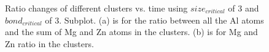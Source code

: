 \newpage
\begingroup
\begin{figure}[!ht]
  \centering
\caption[Ratio changes of different clusters vs. time using $size_{critical}$ of 3 and $bond_{critical}$ of 3.]{Ratio changes of different clusters vs. time using $size_{critical}$ of 3 and $bond_{critical}$ of 3. Subplot. (a) is for the ratio between all the Al atoms and the sum of Mg and Zn atoms in the clusters. (b) is for Mg and Zn ratio in the clusters.}
\label{Chap:Al/Vac:fig:sens_cluster_ratio}
\end{figure}
\endgroup


